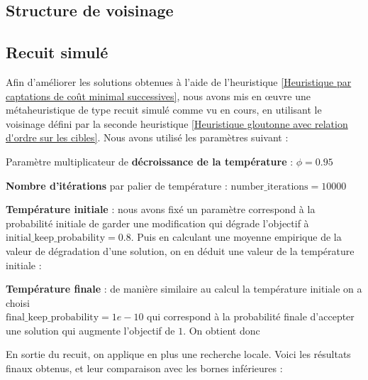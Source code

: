 \documentclass[12pt]{article}
\begin{document}
\subsection{Structure de voisinage}

\subsection{Recuit simulé}

Afin d'améliorer les solutions obtenues à l'aide de l'heuristique \ref{Heuristique par captations de coût minimal successives}, nous avons mis en \oe uvre une métaheuristique de type recuit simulé comme vu en cours, en utilisant le voisinage défini par la seconde heuristique \ref{Heuristique gloutonne avec relation d'ordre sur les cibles}. Nous avons utilisé les paramètres suivant :

\begin{bulletlist}
  \item Paramètre multiplicateur de \textbf{décroissance de la température} : $\phi=0.95$
  \item \textbf{Nombre d'itérations} par palier de température : $\text{number\_iterations} = 10000$
  \item \textbf{Température initiale} : nous avons fixé un paramètre correspond à la probabilité initiale de garder une modification qui dégrade l'objectif à $\text{initial\_keep\_probability} = 0.8$. Puis en calculant une moyenne empirique de la valeur de dégradation d'une solution, on en déduit une valeur de la température initiale : 
  \item \textbf{Température finale} : de manière similaire au calcul la température initiale on a choisi\\ $\text{final\_keep\_probability} = 1e-10$ qui correspond à la probabilité finale d'accepter une solution qui augmente l'objectif de $1$. On obtient donc 
\end{bulletlist}

En sortie du recuit, on applique en plus une recherche locale. Voici les résultats finaux obtenus, et leur comparaison avec les bornes inférieures :
\end{document}
